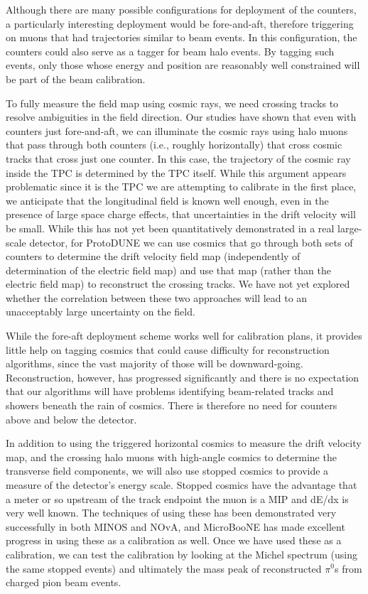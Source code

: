         Although there are many possible configurations for deployment of the
counters, a particularly interesting deployment would be fore-and-aft,
therefore triggering on muons that had trajectories similar to beam events. In
this configuration, the counters could also serve as a tagger for beam halo
events.  By tagging such events, only those whose energy and position are
reasonably well constrained will be part of the beam calibration.

        To fully measure the field map using cosmic rays, we need crossing
tracks to resolve ambiguities in the field direction.  Our studies have shown
that even with counters just fore-and-aft, we can illuminate the cosmic rays
using halo muons that pass through both counters (i.e., roughly horizontally)
that cross cosmic tracks that cross just one counter. In this case, the
trajectory of the cosmic ray inside the TPC is determined by the TPC itself.
While this argument appears problematic since it is the TPC we are attempting
to calibrate in the first place, we anticipate that the longitudinal field is
known well enough, even in the presence of large space charge effects, that
uncertainties in the drift velocity will be small.  While this has not yet been
quantitatively demonstrated in a real large-scale detector, for ProtoDUNE we
can use cosmics that go through both sets of counters to determine the drift
velocity field map (independently of determination of the electric field map)
and use that map (rather than the electric field map) to reconstruct the
crossing tracks.  We have not yet explored whether the correlation between
these two approaches will lead to an unacceptably large uncertainty on the
field.

 While the fore-aft deployment scheme works well for calibration plans,
it provides little help on tagging cosmics that could cause difficulty for
reconstruction algorithms, since the vast majority of those will be
downward-going.  Reconstruction, however, has progressed significantly and
there is no expectation that our algorithms will have problems identifying
beam-related tracks and showers beneath the rain of cosmics. There is therefore
no need for counters above and below the detector.

        In addition to using the triggered horizontal cosmics to measure the
drift velocity map, and the crossing halo muons with high-angle cosmics to
determine the transverse field components, we will also use stopped cosmics to
provide a measure of the detector's energy scale. Stopped cosmics have the
advantage that a meter or so upstream of the track endpoint the muon is a MIP
and dE/dx is very well known. The techniques of using these has been
demonstrated very successfully in both MINOS and NOvA, and MicroBooNE has made
excellent progress in using these as a calibration as well. Once we have used
these as a calibration, we can test the calibration by looking at the Michel
spectrum (using the same stopped events) and ultimately the mass peak of
reconstructed $\pi^0$s from charged pion beam events.

